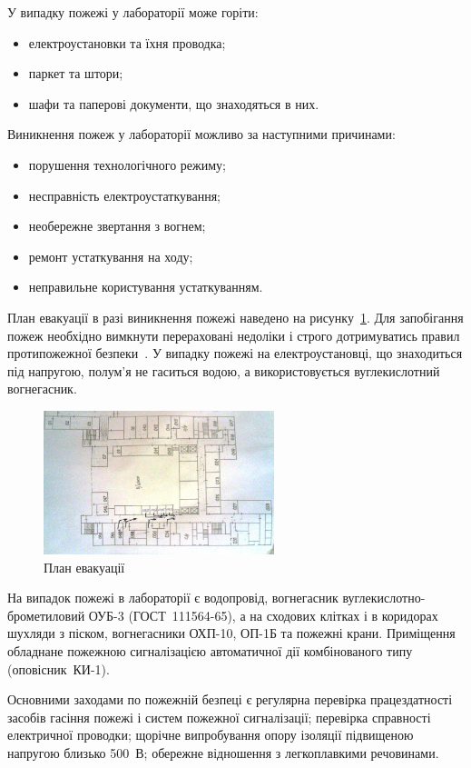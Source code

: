 \documentclass[a4paper,fontsize=14bp,ukrainian]{extreport}
\begin{document}
У випадку пожежі у лабораторії може горіти:
\begin{itemize}
\item електроустановки та їхня проводка;
\item паркет та штори;
\item шафи та паперові документи, що знаходяться в них.
\end{itemize}

Виникнення пожеж у лабораторії можливо за наступними причинами:
\begin{itemize}
\item порушення технологічного режиму;
\item несправність електроустаткування;
\item необережне звертання з вогнем;
\item ремонт устаткування на ходу;
\item неправильне користування устаткуванням.
\end{itemize}

План евакуації в разі виникнення пожежі наведено на рисунку~\ref{fig:schema_evacuation}. Для запобігання пожеж необхідно вимкнути перераховані недоліки і строго дотримуватись правил протипожежної безпеки~\cite{tkachuk2006}. У випадку пожежі на електроустановці, що знаходиться під напругою, полум’я  не гаситься водою, а використовується вуглекислотний вогнегасник.

\begin{figure}[H]
\centering
\includegraphics[width=0.6\textwidth]{schema_evacuation.png}
\caption{План евакуації}
\label{fig:schema_evacuation}
\end{figure}

На випадок пожежі в лабораторії є водопровід, вогнегасник вуглекислотно-брометиловий ОУБ-3 (ГОСТ~111564-65), а на сходових клітках і в коридорах шухляди з піском, вогнегасники ОХП-10, ОП-1Б та пожежні крани. Приміщення обладнане пожежною сигналізацією автоматичної дії комбінованого типу (оповісник~КИ-1).

Основними заходами по пожежній безпеці є регулярна перевірка працездатності засобів гасіння пожежі і систем пожежної сигналізації; перевірка справності електричної проводки; щорічне випробування опору ізоляції підвищеною напругою близько 500~В; обережне відношення з легкоплавкими речовинами.
\end{document}
